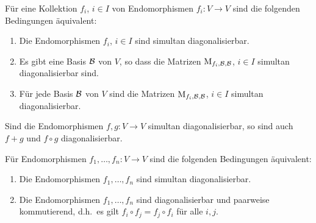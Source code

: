 \begin{lemma}
  Für eine Kollektion $f_i$, $i \in I$ von Endomorphismen $f_i \colon V \to V$ sind die folgenden Bedingungen äquivalent:
  \begin{enumerate}
    \item
      Die Endomorphismen $f_i$, $i \in I$ sind simultan diagonalisierbar.
    \item
      Es gibt eine Basis $\mathcal{B}$ von $V$, so dass die Matrizen $\operatorname{M}_{f_i, \mathcal{B}, \mathcal{B}}$, $i \in I$ simultan diagonalisierbar sind.
    \item
      Für jede Basis $\mathcal{B}$ von $V$ sind die Matrizen $\operatorname{M}_{f_i, \mathcal{B}, \mathcal{B}}$, $i \in I$ simultan diagonalisierbar.
  \end{enumerate}
\end{lemma}

\begin{example}
  Sind die Endomorphismen $f, g \colon V \to V$ simultan diagonalisierbar, so sind auch $f + g$ und $f \circ g$ diagonalisierbar.
\end{example}

\begin{proposition}
  Für Endomorphismen $f_1, \dotsc, f_n \colon V \to V$ sind die folgenden Bedingungen äquivalent:
  \begin{enumerate}
    \item
      Die Endomorphismen $f_1, \dotsc, f_n$ sind simultan diagonalisierbar.
    \item
      Die Endomorphismen $f_1, \dotsc, f_n$ sind diagonalisierbar und paarweise kommutierend, d.h.\ es gilt $f_i \circ  f_j = f_j \circ f_i$ für alle $i, j$.
  \end{enumerate}
\end{proposition}